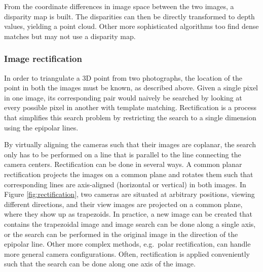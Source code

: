 From the coordinate differences in image space between the two images, a disparity map is built.
The disparities can then be directly transformed to depth values, yielding a point cloud.
Other more sophisticated algorithms too find dense matches but may not use a disparity map.


\subsubsection{Image rectification} %


In order to triangulate a 3D point from two photographs, the location of the point in both the images must be known, as described above.
Given a single pixel in one image, its corresponding pair would naively be searched by looking at every possible pixel in another with template matching.
Rectification is a process that simplifies this search problem by restricting the search to a single dimension using the epipolar lines.
\cite[p. 157]{trucco1998introductory} \cite[ch. 7.1]{pollefeys2004visual}

By virtually aligning the cameras such that their images are coplanar, the search only has to be performed on a line that is parallel to the line connecting the camera centers.
Rectification can be done in several ways.
A common planar rectification projects the images on a common plane and rotates them such that corresponding lines are axis-aligned (horizontal or vertical) in both images. \cite{hartley03multiview}
In Figure \ref{fig:rectification}, two cameras are situated at arbitrary positions, viewing different directions, and their view images are projected on a common plane, where they show up as trapezoids.
In practice, a new image can be created that contains the trapezoidal image and image search can be done along a single axis, or the search can be performed in the original image in the direction of the epipolar line.
Other more complex methods, e.g.\ polar rectification, can handle more general camera configurations. \cite{pollefeys2004visual}
Often, rectification is applied conveniently such that the search can be done along one axis of the image.



